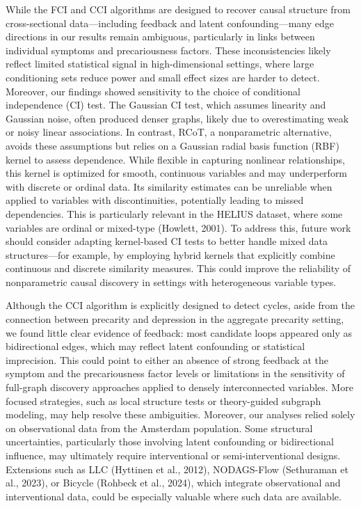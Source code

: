 \documentclass[
]{article}
\begin{document}
While the FCI and CCI algorithms are designed to recover causal
structure from cross-sectional data---including feedback and latent
confounding---many edge directions in our results remain ambiguous,
particularly in links between individual symptoms and precariousness
factors. These inconsistencies likely reflect limited statistical signal
in high-dimensional settings, where large conditioning sets reduce power
and small effect sizes are harder to detect. Moreover, our findings
showed sensitivity to the choice of conditional independence (CI) test.
The Gaussian CI test, which assumes linearity and Gaussian noise, often
produced denser graphs, likely due to overestimating weak or noisy
linear associations. In contrast, RCoT, a nonparametric alternative,
avoids these assumptions but relies on a Gaussian radial basis function
(RBF) kernel to assess dependence. While flexible in capturing nonlinear
relationships, this kernel is optimized for smooth, continuous variables
and may underperform with discrete or ordinal data. Its similarity
estimates can be unreliable when applied to variables with
discontinuities, potentially leading to missed dependencies. This is
particularly relevant in the HELIUS dataset, where some variables are
ordinal or mixed-type (Howlett, 2001). To address this, future work
should consider adapting kernel-based CI tests to better handle mixed
data structures---for example, by employing hybrid kernels that
explicitly combine continuous and discrete similarity measures. This
could improve the reliability of nonparametric causal discovery in
settings with heterogeneous variable types.

Although the CCI algorithm is explicitly designed to detect cycles,
aside from the connection between precarity and depression in the
aggregate precarity setting, we found little clear evidence of feedback:
most candidate loops appeared only as bidirectional edges, which may
reflect latent confounding or statistical imprecision. This could point
to either an absence of strong feedback at the symptom and the
precariousness factor levels or limitations in the sensitivity of
full-graph discovery approaches applied to densely interconnected
variables. More focused strategies, such as local structure tests or
theory-guided subgraph modeling, may help resolve these ambiguities.
Moreover, our analyses relied solely on observational data from the
Amsterdam population. Some structural uncertainties, particularly those
involving latent confounding or bidirectional influence, may ultimately
require interventional or semi-interventional designs. Extensions such
as LLC (Hyttinen et al., 2012), NODAGS-Flow (Sethuraman et al., 2023),
or Bicycle (Rohbeck et al., 2024), which integrate observational and
interventional data, could be especially valuable where such data are
available.
\end{document}
